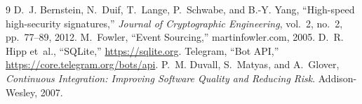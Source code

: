 \documentclass[conference]{IEEEtran}
\begin{document}
\begin{thebibliography}{9}
 D.~J. Bernstein, N.~Duif, T.~Lange, P.~Schwabe, and B.-Y.
Yang, ``High-speed high-security signatures,'' \emph{Journal of Cryptographic
Engineering}, vol.~2, no.~2, pp.~77--89, 2012.
 M.~Fowler, ``Event Sourcing,'' martinfowler.com, 2005.
 D.~R. Hipp et~al., ``SQLite,'' \url{https://sqlite.org}.
 Telegram, ``Bot API,''
\url{https://core.telegram.org/bots/api}.
 P.~M. Duvall, S.~Matyas, and A.~Glover, \emph{Continuous
Integration: Improving Software Quality and Reducing Risk}. Addison-Wesley,
2007.
\end{thebibliography}
\end{document}
